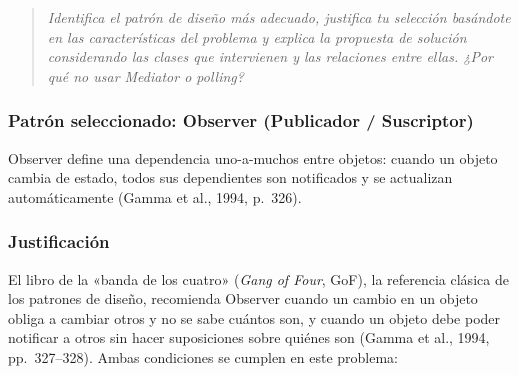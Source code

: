 
\begin{quote}
\itshape
Identifica el patrón de diseño más adecuado, justifica tu selección basándote en las
características del problema y explica la propuesta de solución considerando las clases
que intervienen y las relaciones entre ellas. ¿Por qué no usar Mediator o polling?
\end{quote}

\subsubsection{Patrón seleccionado: Observer (Publicador / Suscriptor)}

Observer define una dependencia uno-a-muchos entre objetos: cuando un objeto cambia de
estado, todos sus dependientes son notificados y se actualizan automáticamente
(Gamma et al., 1994, p.~326).

\subsubsection{Justificación}

El libro de la «banda de los cuatro» (\emph{Gang of Four}, GoF), la referencia clásica de
los patrones de diseño, recomienda Observer cuando un cambio en un objeto obliga a cambiar
otros y no se sabe
cuántos son, y cuando un objeto debe poder notificar a otros sin hacer suposiciones sobre
quiénes son (Gamma et al., 1994, pp.~327--328). Ambas condiciones se cumplen en este problema:

